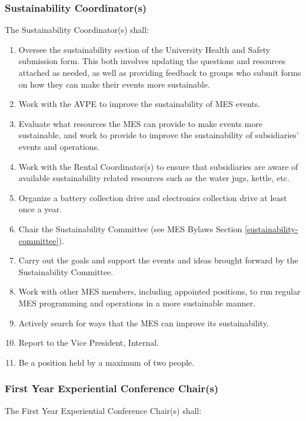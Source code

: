 \subsubsection{Sustainability Coordinator(s)}
\label{sustainability-coordinators}
The Sustainability Coordinator(s) shall:

\begin{enumerate}
 \item
  Oversee the sustainability section of the University Health and Safety submission form. This both involves updating the questions and resources attached as needed, as well as providing feedback to groups who submit forms on how they can make their events more sustainable.
 \item
  Work with the AVPE to improve the sustainability of MES events.
 \item
  Evaluate what resources the MES can provide to make events more sustainable, and work to provide to improve the sustainability of subsidiaries' events and operations.
 \item
  Work with the Rental Coordinator(s) to ensure that subsidiaries are aware of available sustainability related resources such as the water jugs, kettle, etc.
 \item
  Organize a battery collection drive and electronics collection drive at least once a year.
 \item
  Chair the Sustainability Committee (see MES Bylaws Section \ref{sustainability-committee}).
 \item
  Carry out the goals and support the events and ideas brought forward by the Sustainability Committee.
 \item
  Work with other MES members, including appointed positions, to run regular MES programming and operations in a more sustainable manner.
 \item
  Actively search for ways that the MES can improve its sustainability.
 \item
  Report to the Vice President, Internal.
 \item
  Be a position held by a maximum of two people.

\end{enumerate}

\subsubsection{First Year Experiential Conference Chair(s)}
\label{first-year-experiential-conference-chairs}
The First Year Experiential Conference Chair(s) shall:


